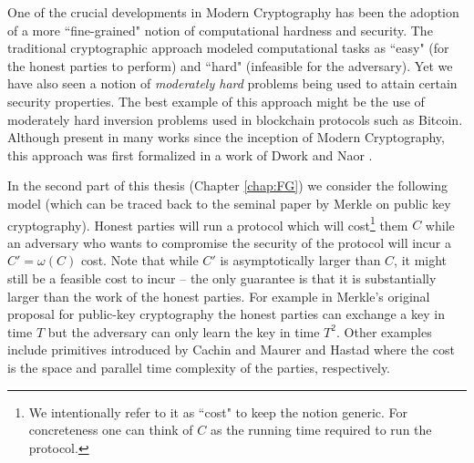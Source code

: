 

One of the crucial developments in Modern Cryptography has been the adoption of a more ``fine-grained" notion of computational hardness and security. The traditional cryptographic approach modeled computational tasks as ``easy" (for the honest parties to perform) and ``hard" (infeasible for the adversary). Yet we have also seen a notion of {\em moderately hard} problems being used to attain certain security properties. The best example of this approach might be the use of moderately hard inversion problems used in blockchain protocols such as Bitcoin. Although present in many works since the inception of Modern Cryptography, this approach was first 
formalized in a work of Dwork and Naor \cite{dn-spam}. 

In the second part of this thesis (Chapter \ref{chap:FG}) we consider the following model (which can be traced back to the seminal paper by Merkle \cite{merkle} on public key cryptography). Honest parties will run a protocol which will cost\footnote{
We intentionally refer to it as ``cost" to keep the notion generic. For concreteness one can think of $C$ as the running time required to run the protocol.} 
them $C$ while an adversary who wants to compromise the security of the protocol will incur a $C'=\omega(C)$ cost. Note that while $C'$ is asymptotically larger than $C$, it might still be a feasible cost to incur -- the only guarantee is that it is 
substantially larger than the work of the honest parties. For example in Merkle's original proposal for public-key cryptography the honest parties can exchange a key in time $T$ but the adversary can only learn the key in time $T^2$. Other examples include primitives introduced by Cachin and
Maurer \cite{maurer} and Hastad \cite{H87} where 
the cost is the space and parallel time complexity of the parties, respectively. 


